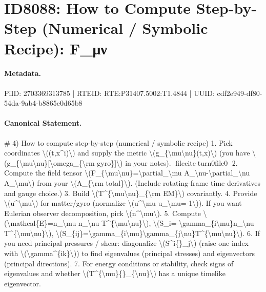 \section*{ID8088: How to Compute Step-by-Step (Numerical / Symbolic Recipe): F\_μν}
\paragraph{Metadata.}
PiID: 2703369313785 | RTEID: RTE:P31407.5002:T1.4844 | UUID: cdf2e949-df80-54da-9ab4-b8865e0d65b8

\paragraph{Canonical Statement.}
\# 4) How to compute step-by-step (numerical / symbolic recipe) 1. Pick coordinates \textbackslash{}((t,x\textasciicircum{}i)\textbackslash{}) and supply the metric \textbackslash{}(g\_\{\textbackslash{}mu\textbackslash{}nu\}(t,x)\textbackslash{}) (you have \textbackslash{}(g\_\{\textbackslash{}mu\textbackslash{}nu\}[\textbackslash{}omega\_\{\textbackslash{}rm gyro\}]\textbackslash{}) in your notes). fileciteturn0file0 2. Compute the field tensor \textbackslash{}(F\_\{\textbackslash{}mu\textbackslash{}nu\}=\textbackslash{}partial\_\textbackslash{}mu A\_\textbackslash{}nu-\textbackslash{}partial\_\textbackslash{}nu A\_\textbackslash{}mu\textbackslash{}) from your \textbackslash{}(A\_\{\textbackslash{}rm total\}\textbackslash{}). (Include rotating-frame time derivatives and gauge choice.) 3. Build \textbackslash{}(T\textasciicircum{}\{\textbackslash{}mu\textbackslash{}nu\}\_\{\textbackslash{}rm EM\}\textbackslash{}) covariantly. 4. Provide \textbackslash{}(u\textasciicircum{}\textbackslash{}mu\textbackslash{}) for matter/gyro (normalize \textbackslash{}(u\textasciicircum{}\textbackslash{}mu u\_\textbackslash{}mu=-1\textbackslash{})). If you want Eulerian observer decomposition, pick \textbackslash{}(n\textasciicircum{}\textbackslash{}mu\textbackslash{}). 5. Compute \textbackslash{}(\textbackslash{}mathcal\{E\}=n\_\textbackslash{}mu n\_\textbackslash{}nu T\textasciicircum{}\{\textbackslash{}mu\textbackslash{}nu\}\textbackslash{}), \textbackslash{}(S\_i=-\textbackslash{}gamma\_\{i\textbackslash{}mu\}n\_\textbackslash{}nu T\textasciicircum{}\{\textbackslash{}mu\textbackslash{}nu\}\textbackslash{}), \textbackslash{}(S\_\{ij\}=\textbackslash{}gamma\_\{i\textbackslash{}mu\}\textbackslash{}gamma\_\{j\textbackslash{}nu\}T\textasciicircum{}\{\textbackslash{}mu\textbackslash{}nu\}\textbackslash{}). 6. If you need principal pressures / shear: diagonalize \textbackslash{}(S\textasciicircum{}i\{\}\_j\textbackslash{}) (raise one index with \textbackslash{}(\textbackslash{}gamma\textasciicircum{}\{ik\}\textbackslash{})) to find eigenvalues (principal stresses) and eigenvectors (principal directions). 7. For energy conditions or stability, check signs of eigenvalues and whether \textbackslash{}(T\textasciicircum{}\{\textbackslash{}mu\}\{\}\_\{\textbackslash{}nu\}\textbackslash{}) has a unique timelike eigenvector.

